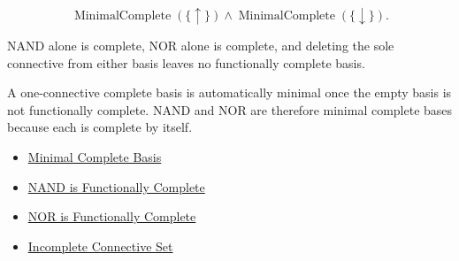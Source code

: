 \begin{remark*}
\[
\operatorname{MinimalComplete}(\{\uparrow\})
\land
\operatorname{MinimalComplete}(\{\downarrow\}).
\]
\end{remark*}



\begin{remark*}[Interpretation]
NAND alone is complete, NOR alone is complete, and deleting the sole connective
from either basis leaves no functionally complete basis.

A one-connective complete basis is automatically minimal once the empty basis is
not functionally complete. NAND and NOR are therefore minimal complete bases
because each is complete by itself.
\end{remark*}

\begin{dependencies}
\begin{itemize}
  \item \hyperref[def:minimal-complete-basis-propositional-logic]{Minimal Complete Basis}
  \item \hyperref[thm:nand-functionally-complete-propositional-logic]{NAND is Functionally Complete}
  \item \hyperref[thm:nor-functionally-complete-propositional-logic]{NOR is Functionally Complete}
  \item \hyperref[def:incomplete-connective-set-propositional-logic]{Incomplete Connective Set}
\end{itemize}
\end{dependencies}
